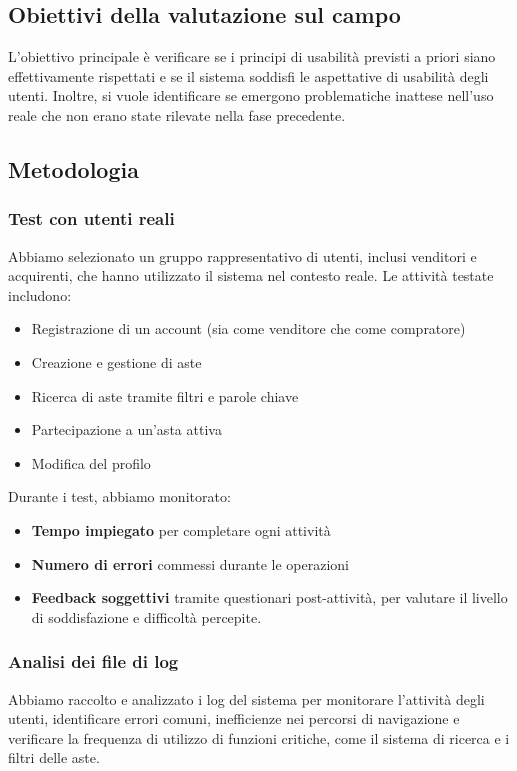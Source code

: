 \subsection{Obiettivi della valutazione sul campo}

L'obiettivo principale è verificare se i principi di usabilità previsti a priori siano effettivamente rispettati e se il sistema soddisfi le aspettative di usabilità degli utenti. Inoltre, si vuole identificare se emergono problematiche inattese nell'uso reale che non erano state rilevate nella fase precedente.

\subsection{Metodologia}

\subsubsection{Test con utenti reali}
Abbiamo selezionato un gruppo rappresentativo di utenti, inclusi venditori e acquirenti, che hanno utilizzato il sistema nel contesto reale. Le attività testate includono:
\begin{itemize}
    \item Registrazione di un account (sia come venditore che come compratore)
    \item Creazione e gestione di aste
    \item Ricerca di aste tramite filtri e parole chiave
    \item Partecipazione a un'asta attiva
    \item Modifica del profilo
\end{itemize}

Durante i test, abbiamo monitorato:
\begin{itemize}
    \item \textbf{Tempo impiegato} per completare ogni attività
    \item \textbf{Numero di errori} commessi durante le operazioni
    \item \textbf{Feedback soggettivi} tramite questionari post-attività, per valutare il livello di soddisfazione e difficoltà percepite.
\end{itemize}

\subsubsection{Analisi dei file di log}
Abbiamo raccolto e analizzato i log del sistema per monitorare l'attività degli utenti, identificare errori comuni, inefficienze nei percorsi di navigazione e verificare la frequenza di utilizzo di funzioni critiche, come il sistema di ricerca e i filtri delle aste.

